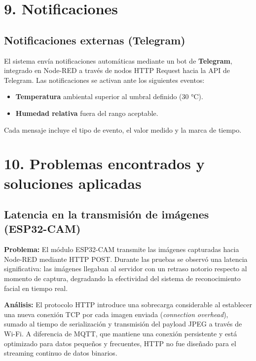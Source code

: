 \documentclass[12pt, a4paper]{report}
\begin{document}
\chapter*{9. Notificaciones}

\section*{Notificaciones externas (Telegram)}

El sistema envía notificaciones automáticas mediante un bot de \textbf{Telegram}, integrado en Node-RED a través de nodos HTTP Request hacia la API de Telegram. Las notificaciones se activan ante los siguientes eventos:

\begin{itemize}
    \item \textbf{Temperatura} ambiental superior al umbral definido (30 °C).
    \item \textbf{Humedad relativa} fuera del rango aceptable.
\end{itemize}

Cada mensaje incluye el tipo de evento, el valor medido y la marca de tiempo.

\chapter*{10. Problemas encontrados y soluciones aplicadas}

\section*{Latencia en la transmisión de imágenes (ESP32-CAM)}

\textbf{Problema:} El módulo ESP32-CAM transmite las imágenes capturadas hacia Node-RED mediante HTTP POST. Durante las pruebas se observó una latencia significativa: las imágenes llegaban al servidor con un retraso notorio respecto al momento de captura, degradando la efectividad del sistema de reconocimiento facial en tiempo real.

\textbf{Análisis:} El protocolo HTTP introduce una sobrecarga considerable al establecer una nueva conexión TCP por cada imagen enviada (\textit{connection overhead}), sumado al tiempo de serialización y transmisión del payload JPEG a través de Wi-Fi. A diferencia de MQTT, que mantiene una conexión persistente y está optimizado para datos pequeños y frecuentes, HTTP no fue diseñado para el streaming continuo de datos binarios.
\end{document}
